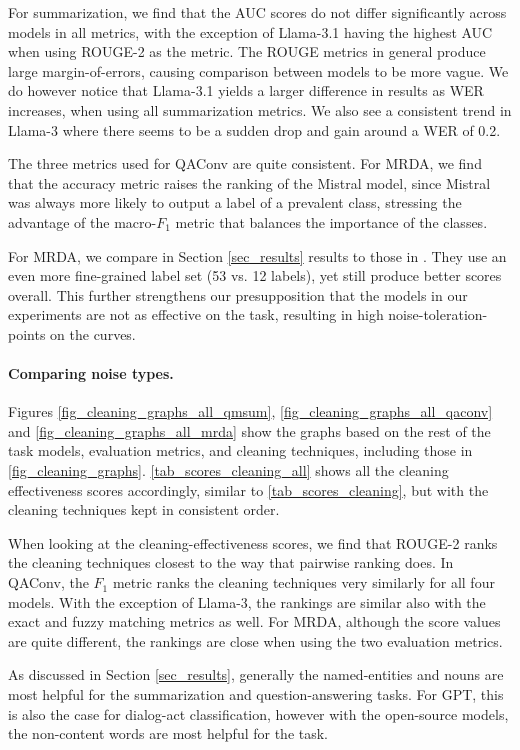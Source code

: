 For summarization, we find that the AUC scores do not differ significantly across models in all metrics, with the exception of Llama-3.1 having the highest AUC when using ROUGE-2 as the metric. The ROUGE metrics in general produce large margin-of-errors, causing comparison between models to be more vague. We do however notice that Llama-3.1 yields a larger difference in results as WER increases, when using all summarization metrics. We also see a consistent trend in Llama-3 where there seems to be a sudden drop and gain around a WER of 0.2.

The three metrics used for QAConv are quite consistent. For MRDA, we find that the accuracy metric raises the ranking of the Mistral model, since Mistral was always more likely to output a label of a prevalent class, stressing the advantage of the macro-$F_1$ metric that balances the importance of the classes.

For MRDA, we compare in Section \ref{sec_results} results to those in \citet{miah-etal-2023-hierarchical}.
They use an even more fine-grained label set (53 vs. 12 labels), yet still produce better scores overall. This further strengthens our presupposition that the models in our experiments are not as effective on the task, resulting in high noise-toleration-points on the curves.

\paragraph{Comparing noise types.}
Figures \ref{fig_cleaning_graphs_all_qmsum}, \ref{fig_cleaning_graphs_all_qaconv} and \ref{fig_cleaning_graphs_all_mrda} show the graphs based on the rest of the task models, evaluation metrics, and cleaning techniques, including those in \autoref{fig_cleaning_graphs}. \autoref{tab_scores_cleaning_all} shows all the cleaning effectiveness scores accordingly, similar to \autoref{tab_scores_cleaning}, but with the cleaning techniques kept in consistent order.

When looking at the cleaning-effectiveness scores, we find that ROUGE-2 ranks the cleaning techniques closest to the way that pairwise ranking does. In QAConv, the $F_1$ metric ranks the cleaning techniques very similarly for all four models. With the exception of Llama-3, the rankings are similar also with the exact and fuzzy matching metrics as well. For MRDA, although the score values are quite different, the rankings are close when using the two evaluation metrics.

As discussed in Section \ref{sec_results}, generally the named-entities and nouns are most helpful for the summarization and question-answering tasks. For GPT, this is also the case for dialog-act classification, however with the open-source models, the non-content words are most helpful for the task.

